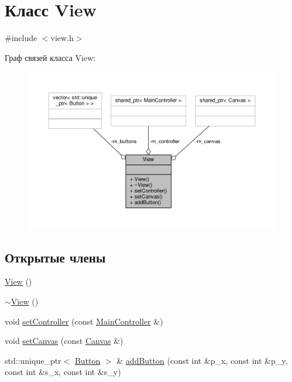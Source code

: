 \hypertarget{class_view}{\section{Класс View}
\label{class_view}
}


{\ttfamily \#include $<$view.\-h$>$}



Граф связей класса View\-:
\nopagebreak
\begin{figure}[H]
\begin{center}
\leavevmode
\includegraphics[width=350pt]{class_view__coll__graph}
\end{center}
\end{figure}
\subsection*{Открытые члены}
\begin{DoxyCompactItemize}
\item 
\hyperlink{class_view_a44ad60a768422d3fa8fbd7576950080a}{View} ()
\item 
\hyperlink{class_view_ad0dc854db9aabbea98a334dec89f785c}{$\sim$\-View} ()
\item 
void \hyperlink{class_view_a081268f0c9e7145c8dbb731ff3fa59a8}{set\-Controller} (const \hyperlink{class_main_controller}{Main\-Controller} \&)
\item 
void \hyperlink{class_view_a5f2dfc50df34d5001d640ae4f344cf81}{set\-Canvas} (const \hyperlink{class_canvas}{Canvas} \&)
\item 
std\-::unique\-\_\-ptr$<$ \hyperlink{class_button}{Button} $>$ \& \hyperlink{class_view_a39afbf509a2dfbcdd3b893d080f08fd4}{add\-Button} (const int \&p\-\_\-x, const int \&p\-\_\-y, const int \&s\-\_\-x, const int \&s\-\_\-y)
\end{DoxyCompactItemize}
